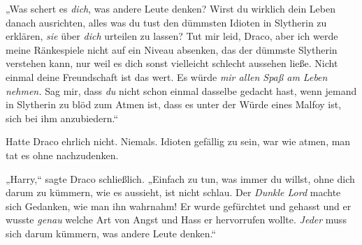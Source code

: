 „Was schert es \emph{dich}, was andere Leute denken? Wirst du wirklich dein Leben danach ausrichten, alles was du tust den dümmsten Idioten in Slytherin zu erklären, \emph{sie} über \emph{dich} urteilen zu lassen? Tut mir leid, Draco, aber ich werde meine Ränkespiele nicht auf ein Niveau absenken, das der dümmste Slytherin verstehen kann, nur weil es dich sonst vielleicht schlecht aussehen ließe. Nicht einmal deine Freundschaft ist das wert. Es würde \emph{mir allen Spaß am Leben nehmen.} Sag mir, dass \emph{du} nicht schon einmal dasselbe gedacht hast, wenn jemand in Slytherin zu blöd zum Atmen ist, dass es unter der Würde eines Malfoy ist, sich bei ihm anzubiedern.“

Hatte Draco ehrlich nicht. Niemals. Idioten gefällig zu sein, war wie atmen, man tat es ohne nachzudenken.

„Harry,“ sagte Draco schließlich. „Einfach zu tun, was immer du willst, ohne dich darum zu kümmern, wie es aussieht, ist nicht schlau. Der \emph{Dunkle Lord} machte sich Gedanken, wie man ihn wahrnahm! Er wurde gefürchtet und gehasst und er wusste \emph{genau} welche Art von Angst und Hass er hervorrufen wollte. \emph{Jeder} muss sich darum kümmern, was andere Leute denken.“

